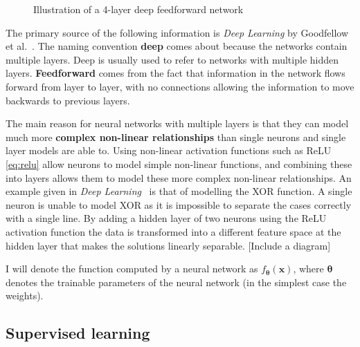 \documentclass[12pt,a4paper,twoside,openright]{report}
\renewcommand{\vec}[1]{\bm{#1}}
\begin{document}
\begin{figure}[H]
\begin{center}
      \caption{Illustration of a 4-layer deep feedforward network}
      \label{fig:illustration_deep_network}
  \end{center}
\end{figure}

The primary source of the following information is \textit{Deep Learning} by Goodfellow et al.~\cite{Goodfellow-et-al-2016}. 
The naming convention \textbf{deep} comes about because the networks contain multiple layers. Deep is usually used to refer to networks 
with multiple hidden layers. \textbf{Feedforward} comes from the fact that information 
in the network flows forward from layer to layer, with no connections allowing the information to move backwards to previous layers.

The main reason for neural networks with multiple layers is that they can model much more \textbf{complex non-linear relationships} than single 
neurons and single layer models are able to. Using non-linear activation functions such as ReLU \eqref{eq:relu} allow neurons to model simple 
non-linear functions, and combining
these into layers allows them to model these more complex non-linear relationships. An example given in \textit{Deep Learning}~\cite{Goodfellow-et-al-2016} 
is that of modelling the XOR function. A single neuron is unable to model XOR as it is impossible to separate the cases 
correctly with a single line. By adding a hidden layer of two neurons using the ReLU activation function the data is 
transformed into a different feature space at the hidden layer that makes the solutions linearly separable. [Include a diagram]

I will denote the function computed by a neural network as $f_{\vec{\theta}}(\vec{x})$, where $\vec{\theta}$ denotes the trainable parameters of the neural
network (in the simplest case the weights).

\subsection{Supervised learning}
\end{document}
